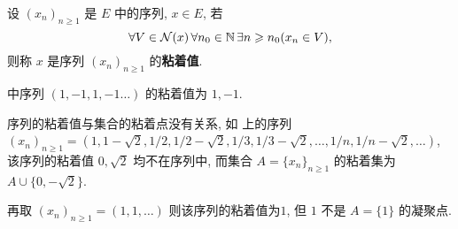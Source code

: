      \begin{Definition}[序列的粘着值]\label{def:序列的粘着值}
          设 $ (x_{n})_{n\geqslant1} $ 是 $ E $ 中的序列,  $ x\in E $, 若
          \[
               \forall V\in\mathcal{N}(x)\,\forall n_{0}\in\mathbb{N}\,\exists n\geqslant n_{0}(x_{n}\in V),
          \]
          则称 $ x $ 是序列 $ (x_{n})_{n\geqslant1} $ 的\textbf{粘着值}.  
     \end{Definition}
     \begin{Example}
          \R 中序列 $ (1, -1, 1, -1\ldots) $ 的粘着值为 $ 1, -1 $.  
     \end{Example}
     \begin{Remark}
          序列的粘着值与集合的粘着点没有关系, 如 \R 上的序列 $ (x_{n})_{n\geqslant1}=(1, 1-\sqrt{2}, {1}/{2}, {1}/{2}-\sqrt{2}, {1}/{3}, {1}/{3}-\sqrt{2}, \ldots, {1}/{n}, {1}/{n}-\sqrt{2}, \ldots) $, 该序列的粘着值 $ 0, \sqrt{2} $ 均不在序列中, 而集合 $ A=\{ x_{n} \}_{n\geqslant1} $ 的粘着集为 $ A\cup\{ 0,-\sqrt{2} \} $. 

          再取 $ (x_{n})_{n\geqslant1}=(1, 1, \ldots) $ 则该序列的粘着值为$1$,  但 $ 1 $ 不是 $ A=\{ 1 \} $ 的凝聚点.  
     \end{Remark}
